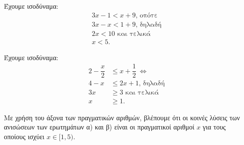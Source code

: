 
\begin{alist}
\item Έχουμε ισοδύναμα:
\begin{gather*}
3x - 1 < x + 9\text{, οπότε} \\
3x - x < 1 + 9\text{, δηλαδή} \\
2x < 10\text{ και τελικά} \\
x < 5.
\end{gather*}

\item Έχουμε ισοδύναμα:
\begin{align*}
2 - \dfrac{x}{2} &\le x + \dfrac{1}{2} \ \Leftrightarrow \\
4 - x &\le 2x + 1\text{, δηλαδή} \\
3x &\ge 3\text{ και τελικά} \\
x &\ge 1.
\end{align*}

\item Με χρήση του άξονα των πραγματικών αριθμών, βλέπουμε ότι οι κοινές λύσεις των ανισώσεων των ερωτημάτων α) και β) είναι οι πραγματικοί αριθμοί $x$ για τους οποίους ισχύει
$x \in [1, 5)$.
\end{alist}

